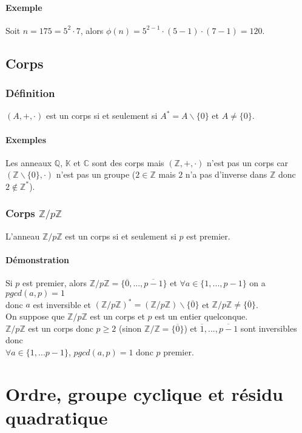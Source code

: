 \documentclass[a4paper,10pt]{book} %
\newcommand{\Z}{\mathbb{Z}}
\newcommand{\C}{\mathbb{C}}
\newcommand{\Q}{\mathbb{Q}}
\newcommand{\K}{\mathbb{K}}
\begin{document}
\subsubsection{Exemple}
Soit $n=175=5^2\cdot 7$, alors $\phi(n)=5^{2-1}\cdot (5-1)\cdot (7-1)=120$.

\newpage

\section{Corps}
\subsection{Définition}
$(A,+,\cdot)$ est un corps si et seulement si $A^*=A\backslash\{0\}$ et $A\neq \{0\}$.

\subsubsection{Exemples}
Les anneaux $\Q$, $\K$ et $\C$ sont des corps mais $(\Z,+,\cdot)$ n'est pas un corps car $(\Z\backslash \{0\},\cdot)$ n'est pas un groupe ($2\in\Z$ mais $2$ n'a pas d'inverse dans $\Z$ donc $2\notin\Z^*$).

\subsection{Corps $\Z/p\Z$}
L'anneau $\Z/p\Z$ est un corps si et seulement si $p$ est premier.

\subsubsection{Démonstration}
Si $p$ est premier, alors $\Z/p\Z=\{\overline{0},...,\overline{p-1}\}$ et 
$\forall a\in \{1,...,p-1\}$ on a $pgcd(a,p)=1$\\donc $a$ est inversible et $(\Z/p\Z)^*=(\Z/p\Z)\backslash\{\overline{0}\}$ et $\Z/p\Z\neq \{\overline{0}\}$.\\

On suppose que $\Z/p\Z$ est un corps et $p$ est un entier quelconque.\\
$\Z/p\Z$ est un corps donc $p\geq 2$ (sinon $\Z/\Z=\{\overline{0}\}$) et $\overline{1},...,\overline{p-1}$ sont inversibles donc\\$\forall a\in \{1,...p-1\}$, $pgcd(a,p)=1$ donc $p$ premier.

\chapter{Ordre, groupe cyclique   et résidu quadratique}
\end{document}
